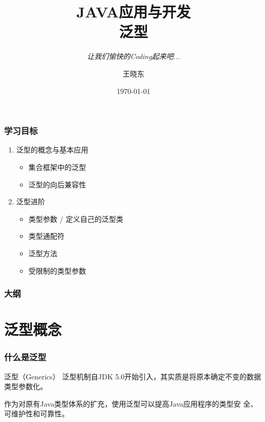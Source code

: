 
\title{\hei JAVA应用与开发\\  泛\quad 型}
\subtitle{\it 让我们愉快的Coding起来吧...}
\author{王晓东}
\date{\today}



\begin{frame}
  \maketitle
\end{frame}

\begin{frame}
  \frametitle{学习目标}
  \begin{enumerate}
  \item 泛型的概念与基本应用
    \begin{itemize}
    \item 集合框架中的泛型
    \item 泛型的向后兼容性
    \end{itemize}
  \item 泛型进阶
    \begin{itemize}
    \item 类型参数 / 定义自己的泛型类
    \item 类型通配符
    \item 泛型方法
    \item 受限制的类型参数
    \end{itemize}
  \end{enumerate}  
\end{frame}

\begin{frame}
  \frametitle{大纲}
  \tableofcontents
\end{frame}

\section{泛型概念}

\begin{frame}[fragile] %
  \frametitle{什么是泛型}

  \begin{block}{泛型（Generics）}
    泛型机制自JDK 5.0开始引入，其实质是{\hei\Blue 将原本确定不变的数据
      类型参数化}。

    作为对原有Java类型体系的扩充，使用泛型可以提高Java应用程序的类型安
    全、可维护性和可靠性。
  \end{block}
\end{frame}

